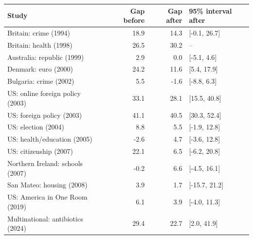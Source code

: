 \begin{tabular}{lrrl}
\toprule
Study & Gap before & Gap after & 95\% interval after \\
\midrule
Britain: crime (1994) & 18.9 & 14.3 & [-0.1, 26.7] \\
Britain: health (1998) & 26.5 & 30.2 & -- \\
Australia: republic (1999) & 2.9 & 0.0 & [-5.1, 4.6] \\
Denmark: euro (2000) & 24.2 & 11.6 & [5.4, 17.9] \\
Bulgaria: crime (2002) & 5.5 & -1.6 & [-8.8, 6.3] \\
US: online foreign policy (2003) & 33.1 & 28.1 & [15.5, 40.8] \\
US: foreign policy (2003) & 41.1 & 40.5 & [30.3, 52.4] \\
US: election (2004) & 8.8 & 5.5 & [-1.9, 12.8] \\
US: health/education (2005) & -2.6 & 4.7 & [-3.6, 12.8] \\
US: citizenship (2007) & 22.1 & 6.5 & [-6.2, 20.8] \\
Northern Ireland: schools (2007) & -0.2 & 6.6 & [-4.5, 16.1] \\
San Mateo: housing (2008) & 3.9 & 1.7 & [-15.7, 21.2] \\
US: America in One Room (2019) & 6.1 & 3.9 & [-4.0, 11.3] \\
Multinational: antibiotics (2024) & 29.4 & 22.7 & [2.0, 41.9] \\
\bottomrule
\end{tabular}
